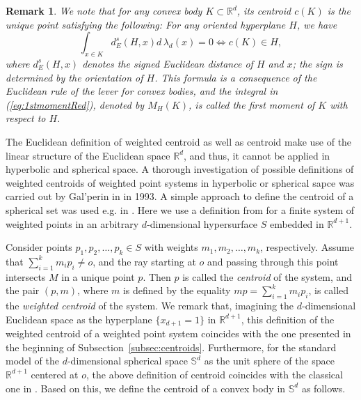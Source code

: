 \documentclass[twoside]{amsart}
\theoremstyle{plain}
\newtheorem{remark}[theorem]{Remark}
\theoremstyle{definition}
\numberwithin{equation}{section}
\renewcommand{\Re}{\mathbb R}
\newcommand{\Sph}{\mathbb{S}}
\begin{document}
\begin{remark}\label{rem:leverruleRed}
We note that for any convex body $K \subset \Re^d$, its centroid $c(K)$ is the unique point satisfying the following:
For any oriented hyperplane $H$, we have
\begin{equation}\label{eq:1stmomentRed}
\int_{x \in K} d_E^s(H,x) d \, \lambda_d(x) = 0 \Longleftrightarrow c(K) \in H,
\end{equation}
where $d_E^s(H,x)$ denotes the signed Euclidean distance of $H$ and $x$; the sign is determined by the orientation of $H$. This formula is a consequence of the Euclidean rule of the lever for convex bodies, and the integral in (\ref{eq:1stmomentRed}), denoted by $M_H(K)$, is called the \emph{first moment} of $K$ with respect to $H$.
\end{remark}

The Euclidean definition of weighted centroid as well as centroid make use of the linear structure of the Euclidean space $\Re^d$, and thus, it cannot be applied
in hyperbolic and spherical space. A thorough investigation of possible definitions of weighted centroids of weighted point systems in hyperbolic or spherical sapce was carried out by Gal'perin in \cite{Galperin} in 1993. A simple approach to define the centroid of a spherical set was used e.g. in \cite{Brock, Bjerre, Fog, BHPS}. Here we use a definition from \cite{Galperin} for a finite system of weighted points in an arbitrary $d$-dimensional hypersurface $S$ embedded in $\Re^{d+1}$.

Consider points $p_1, p_2, \ldots, p_k \in S$ with weights $m_1, m_2, \ldots, m_k$, respectively. Assume that $\sum_{i=1}^k m_i p_i \neq o$, and the ray starting at $o$ and passing through this point intersects $M$ in a unique point $p$. Then $p$ is called the \emph{centroid} of the system, and the pair $(p,m)$, where $m$ is defined by the equality $m p = \sum_{i=1}^k m_i p_i$, is called the \emph{weighted centroid} of the system.
We remark that, imagining the $d$-dimensional Euclidean space as the hyperplane $\{ x_{d+1}= 1 \}$ in $\Re^{d+1}$, this definition of the weighted centroid of a weighted point system coincides with the one presented in the beginning of Subsection~\ref{subsec:centroids}.
Furthermore, for the standard model of the $d$-dimensional spherical space $\Sph^d$ as the unit sphere of the space $\Re^{d+1}$ centered at $o$, the above definition of centroid coincides with the classical one in \cite{Brock, Bjerre, Fog, BHPS}.
Based on this, we define the centroid of a convex body in $\Sph^d$ as follows.
\end{document}
